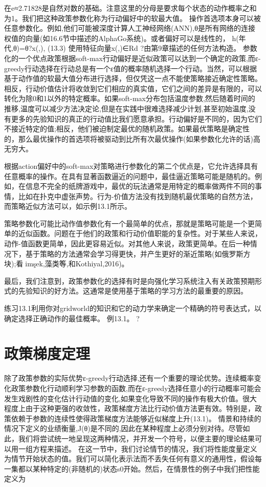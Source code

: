 在e≈2.71828是自然对数的基础。注意这里的分母是要求每个状态的动作概率之和为1。我们把这种政策参数化称为行动偏好中的软最大值。
操作首选项本身可以被任意参数化。例如,他们可能被深度计算人工神经网络(ANN),θ是所有网络的连接权值的向量(如16.6节中描述的AlphaGo系统)。或者偏好可以是线性的，
h(年代,θ)=θ?x(,), 					(13.3)
使用特征向量x(,)∈Rd ?由第9章描述的任何方法构造。
参数化的一个优点政策根据soft-max行动偏好是近似政策可以达到一个确定的政策,而ε-greedy行动选择在行动总是有一个ε值的概率随机选择一个行动。当然，可以根据基于动作值的软最大值分布进行选择，但仅凭这一点不能使策略接近确定性策略。相反，行动价值估计将收敛到它们相应的真实值，它们之间的差异是有限的，可以转化为除0和1以外的特定概率。如果soft-max分布包括温度参数,然后随着时间的推移,温度可以减少方法决定论,但是在实践中很难选择减少计划,甚至初始温度,没有更多的先验知识的真正的行动值比我们愿意承担。行动偏好是不同的，因为它们不接近特定的值;相反，他们被迫制定最优的随机政策。如果最优策略是确定性的，那么最优操作的首选项将被驱动到比所有次最优操作(如果参数化允许的话)高无穷大。

根据action偏好中的soft-max对策略进行参数化的第二个优点是，它允许选择具有任意概率的操作。在具有显著函数逼近的问题中，最佳逼近策略可能是随机的。例如，在信息不完全的纸牌游戏中，最优的玩法通常是用特定的概率做两件不同的事情，比如在扑克中虚张声势。行为-价值方法没有找到随机最优策略的自然方法，而策略近似方法可以，如示例13.1所示。
 

策略参数化可能比动作值参数化有一个最简单的优点，那就是策略可能是一个更简单的近似函数。问题在于他们的政策和行动价值职能的复杂性。对于某些人来说，动作-值函数更简单，因此更容易近似。对其他人来说，政策更简单。在后一种情况下，基于策略的方法通常会学习得更快，并产生更好的渐近策略(如俄罗斯方块);看到̧imşek,藻类́等,和Kothiyal,2016)。

最后，我们注意到，政策参数化的选择有时是向强化学习系统注入有关政策预期形式的先验知识的好方法。这通常是使用基于策略的学习方法的最重要的原因。

练习13.1利用你对gridworld的知识和它的动力学来确定一个精确的符号表达式，以确定选择正确动作的最佳概率。
例13.1。 					?


\section{政策梯度定理}

除了政策参数的实际优势ε-greedy行动选择,还有一个重要的理论优势。连续概率变化政策参数化行动顺利学习参数的函数,而在ε-greedy选择任意小的行动概率可能会发生戏剧性的变化估计行动值的变化,如果变化导致不同的操作有极大价值。很大程度上由于这种更强的收敛性，政策梯度方法比行动价值方法更有效。特别是，政策依赖于参数的连续性使得政策梯度方法能够近似梯度上升(13.1)。
情景和持续的情况下定义的业绩衡量,J(θ)是不同的,因此在某种程度上必须分别对待。尽管如此，我们将尝试统一地呈现这两种情况，并开发一个符号，以便主要的理论结果可以用一组方程来描述。
在这一节中，我们讨论情节的情况，我们将性能度量定义为情节开始状态的值。我们可以简化表示法而不丢失任何有意义的通用性，假设每一集都以某种特定的(非随机的)状态s0开始。然后，在情景性的例子中我们把性能定义为

